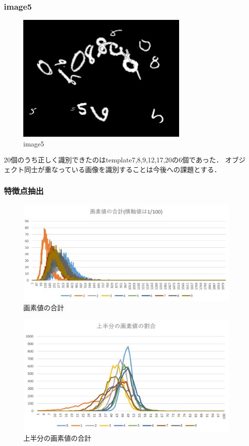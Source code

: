 \documentclass[uplatex,dvipdfmx]{jsarticle}
\begin{document}
\subsubsection{image5}
\begin{figure}[h]
\centering
\includegraphics[clip,width = 8.5cm]{images/image5.png}
\caption{image5}
\label{graph5}
\end{figure}
20個のうち正しく識別できたのはtemplate7,8,9,12,17,20の6個であった．
オブジェクト同士が重なっている画像を識別することは今後への課題とする．

\subsubsection{特徴点抽出}

\begin{figure}[h]
\centering
\includegraphics[clip,width = 11.5cm]{images/graph/summation.png}
\caption{画素値の合計}
\label{summation}
\end{figure}

\begin{figure}[h]
\centering
\includegraphics[clip,width = 11.5cm]{images/graph/upper.png}
\caption{上半分の画素値の合計}
\label{upper}
\end{figure}
\end{document}
